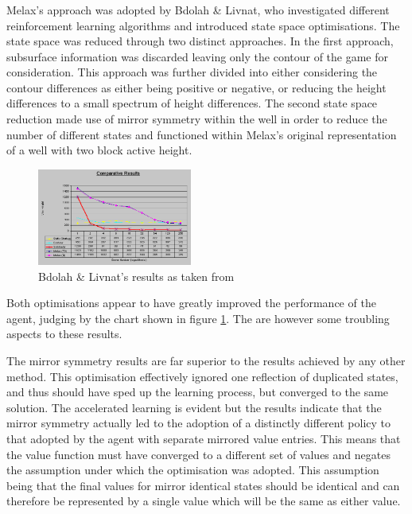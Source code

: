 \documentclass{rucsthesis}
\begin{document}
\subsubsection{\cite{yaeltetris}}

Melax's approach was adopted by Bdolah \& Livnat, who investigated different reinforcement learning algorithms and introduced state space optimisations. The state space was reduced through two distinct approaches. In the first approach, subsurface information was discarded leaving only the contour of the game for consideration. This approach was further divided into either considering the contour differences as either being positive or negative, or reducing the height differences to a small spectrum of height differences. The second state space reduction made use of mirror symmetry within the well in order to reduce the number of different states and functioned within Melax's original representation of a well with two block active height.

\begin{figure}[h]
\centering
\includegraphics[width=2in]{results.png}
\caption{Bdolah \& Livnat's results as taken from \cite{yaeltetris}}
\label{fig:yaelres}
\end{figure}

Both optimisations appear to have greatly improved the performance of the agent, judging by the chart shown in figure \ref{fig:yaelres}. The are however some troubling aspects to these results.

The mirror symmetry results are far superior to the results achieved by any other method. This optimisation effectively ignored one reflection of duplicated states, and thus should have sped up the learning process, but converged to the same solution. The accelerated learning is evident but the results indicate that the mirror symmetry actually led to the adoption of a distinctly different policy to that adopted by the agent with separate mirrored value entries. This means that the value function must have converged to a different set of values and negates the assumption under which the  optimisation was adopted. This assumption being that the final values for mirror identical states should be identical and can therefore be represented by a single value which will be the same as either value. 
\end{document}
